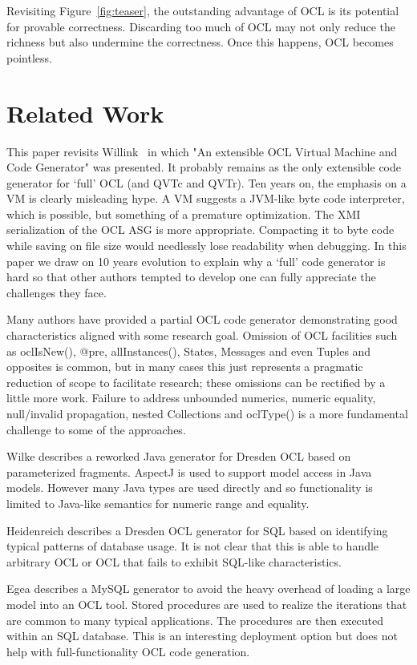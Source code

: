 \documentclass[sigconf]{acmart}
\begin{document}
Revisiting Figure~\ref{fig:teaser}, the outstanding advantage of OCL is its potential for provable correctness. Discarding too much of OCL may not only reduce the richness but also undermine the correctness. Once this happens, OCL becomes pointless.

\section{Related Work}\label{Related Work}

This paper revisits Willink~\cite{Willink2012} in which "An extensible OCL Virtual Machine and Code Generator" was presented. It probably remains as the only extensible code generator for `full' OCL (and QVTc and QVTr). Ten years on, the emphasis on a VM is clearly misleading hype. A VM suggests a JVM-like byte code interpreter, which is possible, but something of a premature optimization. The XMI serialization of the OCL ASG is more appropriate. Compacting it to byte code while saving on file size would needlessly lose readability when debugging. In this paper we draw on 10 years evolution to explain why a `full' code generator is hard so that other authors tempted to develop one can fully appreciate the challenges they face.

Many authors have provided a partial OCL code generator demonstrating good characteristics aligned with some research goal. Omission of OCL facilities such as oclIsNew(), @pre,  allInstances(), States, Messages and even Tuples and opposites is common, but in many cases this just represents a pragmatic reduction of scope to facilitate research; these omissions can be rectified by a little more work. Failure to address unbounded numerics, numeric equality, null/invalid propagation, nested Collections and oclType() is a more fundamental challenge to some of the approaches. 

Wilke\cite{Dresden/JavaCG} describes a reworked  Java generator for Dresden OCL based on parameterized fragments.
AspectJ is used to support model access in Java models. However many Java types are used directly and so functionality is limited to Java-like semantics for numeric range and equality.

Heidenreich\cite{QueryCode} describes a Dresden OCL generator for SQL based on identifying typical patterns of database usage. It is not clear that this is able to handle arbitrary OCL or OCL that fails to exhibit SQL-like characteristics.

Egea\cite{MySQL4OCL} describes a MySQL generator to avoid the heavy overhead of loading a large model into an OCL tool. Stored procedures are used to realize the iterations that are common to many typical applications. The procedures are then executed within an SQL database. This is an interesting deployment option but does not help with full-functionality OCL code generation.
\end{document}
